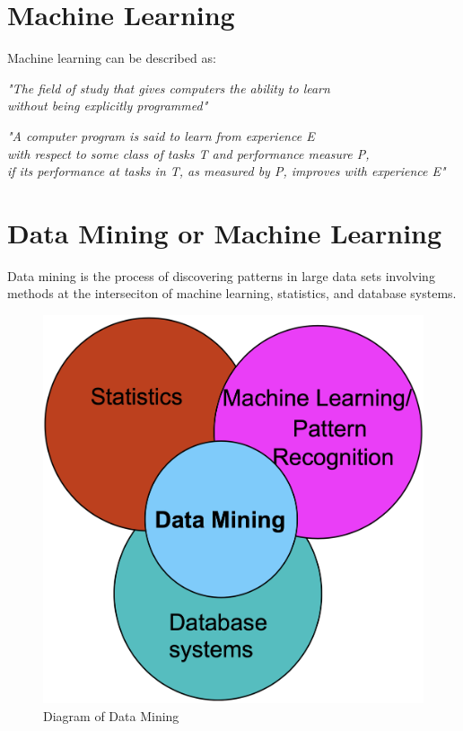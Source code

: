 \section{Machine Learning}

Machine learning can be described as:

\begin{center}
    \textit{"The field of study that gives computers the ability to learn \\
    without being explicitly programmed"}
\end{center}

\begin{center}
    \textit{"A computer program is said to learn from experience E \\
     with respect to some class of tasks T and performance measure P, \\
     if its performance at tasks in T, as measured by P, improves with experience E"}
\end{center}

\newpage
\section{Data Mining or Machine Learning}

Data mining is the process of discovering patterns in large data sets involving methods at the interseciton of machine learning, statistics, and database systems.
\begin{figure}[H]
    \centering
    \includegraphics[scale=0.2]{figures/datamining.png}
    \caption{Diagram of Data Mining}
\end{figure}


